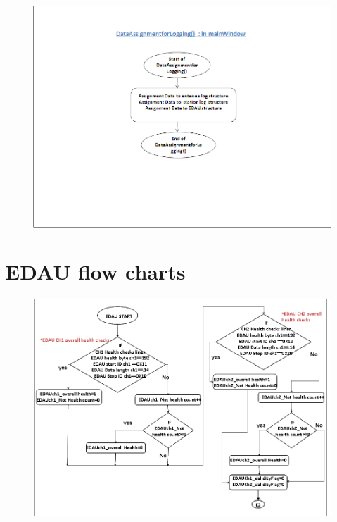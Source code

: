 \begin{figure}[H]
	\centering
	\includegraphics[width=\linewidth]{./FlowCharts/PngFlowCharts/TCP11.png}
\end{figure}

\section{EDAU flow charts}
\begin{figure}[H]
	\centering
	\includegraphics[width=\linewidth]{./FlowCharts/PngFlowCharts/EDAU1.png}
\end{figure}

